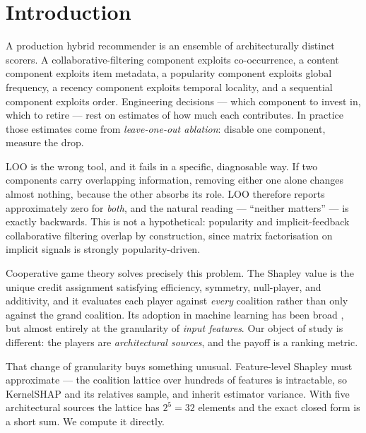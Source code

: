 \documentclass[11pt]{article}
\begin{document}
\section{Introduction}

A production hybrid recommender is an ensemble of architecturally distinct
scorers. A collaborative-filtering component exploits co-occurrence, a
content component exploits item metadata, a popularity component exploits
global frequency, a recency component exploits temporal locality, and a
sequential component exploits order. Engineering decisions --- which component
to invest in, which to retire --- rest on estimates of how much each
contributes. In practice those estimates come from \emph{leave-one-out
ablation}: disable one component, measure the drop.

LOO is the wrong tool, and it fails in a specific, diagnosable way. If two
components carry overlapping information, removing either one alone changes
almost nothing, because the other absorbs its role. LOO therefore reports
approximately zero for \emph{both}, and the natural reading --- ``neither
matters'' --- is exactly backwards. This is not a hypothetical: popularity and
implicit-feedback collaborative filtering overlap by construction, since matrix
factorisation on implicit signals is strongly popularity-driven.

Cooperative game theory solves precisely this problem. The Shapley value
\citep{shapley1953} is the unique credit assignment satisfying efficiency,
symmetry, null-player, and additivity, and it evaluates each player against
\emph{every} coalition rather than only against the grand coalition. Its
adoption in machine learning has been broad \citep{lundberg2017,
covert2021explaining}, but almost entirely at the granularity of \emph{input
features}. Our object of study is different: the players are
\emph{architectural sources}, and the payoff is a ranking metric.

That change of granularity buys something unusual. Feature-level Shapley must
approximate --- the coalition lattice over hundreds of features is
intractable, so KernelSHAP and its relatives sample, and inherit estimator
variance. With five architectural sources the lattice has $2^5 = 32$ elements
and the exact closed form is a short sum. We compute it directly.
\end{document}
